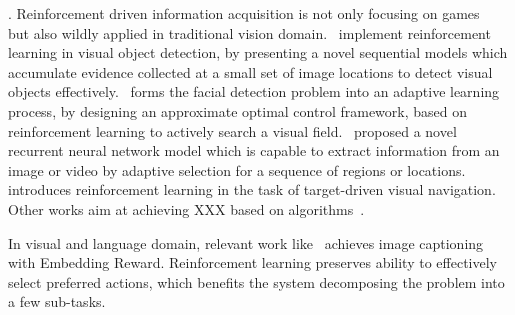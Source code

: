 . Reinforcement driven information acquisition is not only focusing on games~\cite{NIPS2017_7084,NIPS2002_2171,NIPS2017_7007} but also wildly applied in traditional vision domain.~\cite{DBLP:conf/cvpr/MathePS16} implement reinforcement learning in visual object detection, by presenting a novel sequential
models which accumulate evidence collected at a small set of
image locations to detect visual objects effectively.~\cite{DBLP:conf/cvpr/GoodrichA12} forms the facial detection problem into an adaptive learning process, by designing an approximate optimal control framework, based on reinforcement learning to actively search a visual field.~\cite{DBLP:conf/nips/MnihHGK14} proposed a novel recurrent neural network model which is capable to extract information from an image or video by adaptive selection for a sequence of regions or locations.~\cite{zhu2017icra} introduces reinforcement learning in the task of target-driven visual navigation. Other works aim at achieving {\color{red}XXX} based on algorithms~\cite{5596468,DBLP:conf/aaai/AbtahiF11}.

In visual and language domain, relevant work like~\cite{DBLP:conf/cvpr/RenWZLL17} achieves image captioning with Embedding Reward. Reinforcement learning preserves ability to effectively select preferred actions, which benefits the system decomposing the problem into a few sub-tasks.




